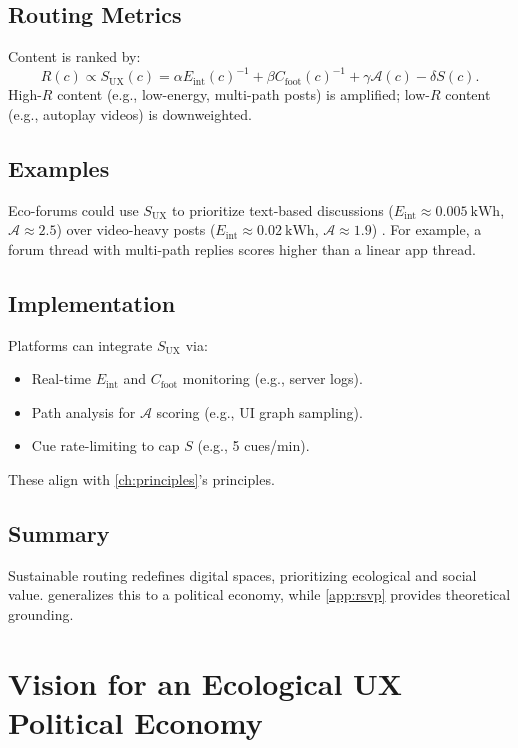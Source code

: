 \documentclass[openany]{book}
\newcommand{\Sent}{S} %
\newcommand{\Eint}{E_{\mathrm{int}}} %
\newcommand{\Cfoot}{C_{\mathrm{foot}}} %
\newcommand{\Auton}{\mathcal{A}} %
\newcommand{\SUX}{S_{\mathrm{UX}}} %
\newcommand{\kWh}{\mathrm{kWh}}
\begin{document}
\section{Routing Metrics}
\label{sec:routing-metrics}
Content is ranked by:
\begin{equation}
\label{eq:routing}
R(c) \propto \SUX(c) = \alpha \Eint(c)^{-1} + \beta \Cfoot(c)^{-1} + \gamma \Auton(c) - \delta \Sent(c).
\end{equation}
High-$R$ content (e.g., low-energy, multi-path posts) is amplified; low-$R$ content (e.g., autoplay videos) is downweighted.

\section{Examples}
\label{sec:routing-examples}
Eco-forums could use $\SUX$ to prioritize text-based discussions ($\Eint \approx \SI{0.005}{\kWh}$, $\Auton \approx 2.5$) over video-heavy posts ($\Eint \approx \SI{0.02}{\kWh}$, $\Auton \approx 1.9$) \citep{doctorow2022}. For example, a forum thread with multi-path replies scores higher than a linear app thread.

\section{Implementation}
\label{sec:routing-impl}
Platforms can integrate $\SUX$ via:
\begin{itemize}
  \item Real-time $\Eint$ and $\Cfoot$ monitoring (e.g., server logs).
  \item Path analysis for $\Auton$ scoring (e.g., UI graph sampling).
  \item Cue rate-limiting to cap $\Sent$ (e.g., 5 cues/min).
\end{itemize}
These align with \cref{ch:principles}’s principles.

\section{Summary}
Sustainable routing redefines digital spaces, prioritizing ecological and social value.  generalizes this to a political economy, while \cref{app:rsvp} provides theoretical grounding.

\chapter{Vision for an Ecological UX Political Economy}
\label{ch:vision}
\end{document}
